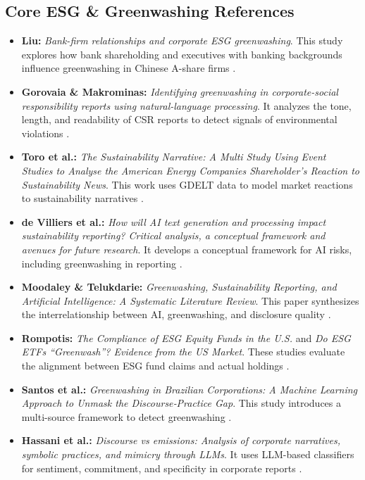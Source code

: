 \documentclass{article}
\begin{document}
\subsection*{Core ESG \& Greenwashing References}
\begin{itemize}
\item 

\textbf{Liu:} \textit{Bank-firm relationships and corporate ESG greenwashing}. This study explores how bank shareholding and executives with banking backgrounds influence greenwashing in Chinese A-share firms  \parencite{hongyu_liu_166902aa}.\item 

\textbf{Gorovaia \& Makrominas:} \textit{Identifying greenwashing in corporate-social responsibility reports using natural-language processing}. It analyzes the tone, length, and readability of CSR reports to detect signals of environmental violations  \parencite{nina_gorovaia_e5c8a617}.\item 

\textbf{Toro et al.:} \textit{The Sustainability Narrative: A Multi Study Using Event Studies to Analyse the American Energy Companies Shareholder’s Reaction to Sustainability News}. This work uses GDELT data to model market reactions to sustainability narratives  \parencite{alberto_barroso_del_toro_eb0c419a}.\item 

\textbf{de Villiers et al.:} \textit{How will AI text generation and processing impact sustainability reporting? Critical analysis, a conceptual framework and avenues for future research}. It develops a conceptual framework for AI risks, including greenwashing in reporting  \parencite{charl_de_villiers_b3caa733}.\item 

\textbf{Moodaley \& Telukdarie:} \textit{Greenwashing, Sustainability Reporting, and Artificial Intelligence: A Systematic Literature Review}. This paper synthesizes the interrelationship between AI, greenwashing, and disclosure quality  \parencite{wayne_moodaley_7fb53f91}.\item 

\textbf{Rompotis:} \textit{The Compliance of ESG Equity Funds in the U.S.} and \textit{Do ESG ETFs “Greenwash”? Evidence from the US Market}. These studies evaluate the alignment between ESG fund claims and actual holdings  \parencite[]{gerasimos_g__rompotis_6d041090, geras_mos_rompotis_a9719f50}.\item 

\textbf{Santos et al.:} \textit{Greenwashing in Brazilian Corporations: A Machine Learning Approach to Unmask the Discourse‐Practice Gap}. This study introduces a multi-source framework to detect greenwashing  \parencite{isabelly_alves_alvares_dos_santos_d1e59ef3}.\item 

\textbf{Hassani et al.:} \textit{Discourse vs emissions: Analysis of corporate narratives, symbolic practices, and mimicry through LLMs}. It uses LLM-based classifiers for sentiment, commitment, and specificity in corporate reports  \parencite{bertrand_k__hassani_0085231f}.
\end{itemize}
\end{document}
